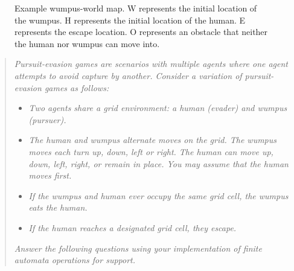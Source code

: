 \documentclass[12pt,letterpaper]{ntdhw}
\begin{document}
\begin{figure}[b]
  \centering
  \caption{Example wumpus-world map.  W represents the initial
    location of the wumpus.  H represents the initial location of the
    human.  E represents the escape location.  O represents an
    obstacle that neither the human nor wumpus can move into.}
  \label{fig:map}
\end{figure}

\begin{quote}

\emph{\emph{Pursuit-evasion games} are scenarios with multiple agents
  where one agent attempts to avoid capture by another.  Consider a
  variation of pursuit-evasion games as follows:}

\begin{itemize}
  \item \it Two agents share a grid environment: a human (evader) and wumpus
  (pursuer).
  \item \it The human and wumpus alternate moves on the grid.  The
  wumpus moves each turn up, down, left or right.  The human can move
  up, down, left, right, or remain in place.  You may assume that the
  human moves first.
  \item \it If the wumpus and human ever occupy the same grid cell,
  the wumpus eats the human.
  \item \it If the human reaches a designated grid cell, they escape.
\end{itemize}

\emph{Answer the following questions using your implementation of finite
automata operations for support.}

\end{quote}
\end{document}
